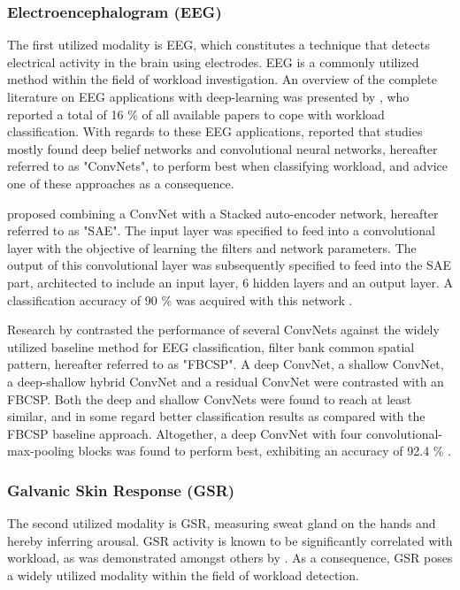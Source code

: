 \documentclass[12pt]{article}
\begin{document}
\subsubsection{Electroencephalogram (EEG)}
The first utilized modality is EEG, which constitutes a technique that detects electrical activity in the brain using electrodes. EEG is a commonly utilized method within the field of workload investigation. An overview of the complete literature on EEG applications with deep-learning was presented by , who reported a total of 16 \% of all available papers to cope with workload classification. With regards to these EEG applications,  reported that studies mostly found deep belief networks and convolutional neural networks, hereafter referred to as "ConvNets", to perform best when classifying workload, and advice one of these approaches as a consequence.

 proposed combining a ConvNet with a Stacked auto-encoder network, hereafter referred to as "SAE". The input layer was specified to feed into a convolutional layer with the objective of learning the filters and network parameters. The output of this convolutional layer was subsequently specified to feed into the SAE part, architected to include an input layer, 6 hidden layers and an output layer. A classification accuracy of 90 \% was acquired with this network \cite{tabar2016novel}. 

Research by  contrasted the performance of several ConvNets against the widely utilized baseline method for EEG classification, filter bank common spatial pattern, hereafter referred to as "FBCSP". A deep ConvNet, a shallow ConvNet, a deep-shallow hybrid ConvNet and a residual ConvNet were contrasted with an FBCSP. Both the deep and shallow ConvNets were found to reach at least similar, and in some regard better classification results as compared with the FBCSP baseline approach. Altogether, a deep ConvNet with four convolutional-max-pooling blocks was found to perform best, exhibiting an accuracy of 92.4 \% \cite{schirrmeister2017deep}.

\subsubsection{Galvanic Skin Response (GSR)}
The second utilized modality is GSR, measuring sweat gland on the hands and hereby inferring arousal. GSR activity is known to be significantly correlated with workload, as was demonstrated amongst others by . As a consequence, GSR poses a widely utilized modality within the field of workload detection. 
\end{document}
